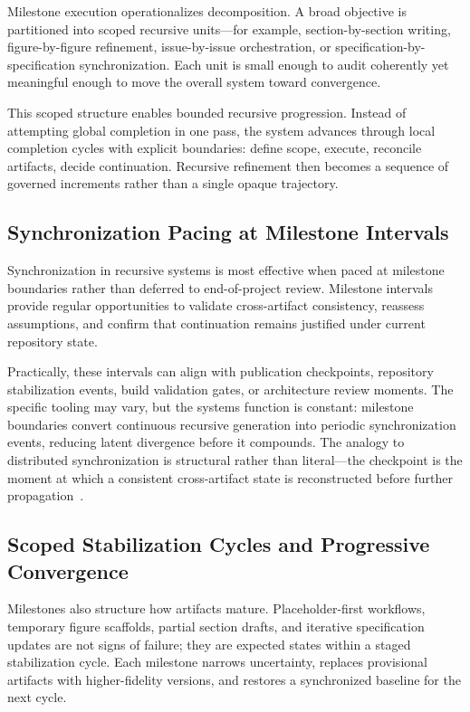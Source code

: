 Milestone execution operationalizes decomposition. A broad objective is partitioned into scoped recursive units---for example, section-by-section writing, figure-by-figure refinement, issue-by-issue orchestration, or specification-by-specification synchronization. Each unit is small enough to audit coherently yet meaningful enough to move the overall system toward convergence.

This scoped structure enables bounded recursive progression. Instead of attempting global completion in one pass, the system advances through local completion cycles with explicit boundaries: define scope, execute, reconcile artifacts, decide continuation. Recursive refinement then becomes a sequence of governed increments rather than a single opaque trajectory.

\subsection{Synchronization Pacing at Milestone Intervals}

Synchronization in recursive systems is most effective when paced at milestone boundaries rather than deferred to end-of-project review. Milestone intervals provide regular opportunities to validate cross-artifact consistency, reassess assumptions, and confirm that continuation remains justified under current repository state.

Practically, these intervals can align with publication checkpoints, repository stabilization events, build validation gates, or architecture review moments. The specific tooling may vary, but the systems function is constant: milestone boundaries convert continuous recursive generation into periodic synchronization events, reducing latent divergence before it compounds. The analogy to distributed synchronization is structural rather than literal---the checkpoint is the moment at which a consistent cross-artifact state is reconstructed before further propagation~\cite{Lamport1978TimeClocks,Chandy1985DistributedSnapshots}.

\subsection{Scoped Stabilization Cycles and Progressive Convergence}

Milestones also structure how artifacts mature. Placeholder-first workflows, temporary figure scaffolds, partial section drafts, and iterative specification updates are not signs of failure; they are expected states within a staged stabilization cycle. Each milestone narrows uncertainty, replaces provisional artifacts with higher-fidelity versions, and restores a synchronized baseline for the next cycle.

